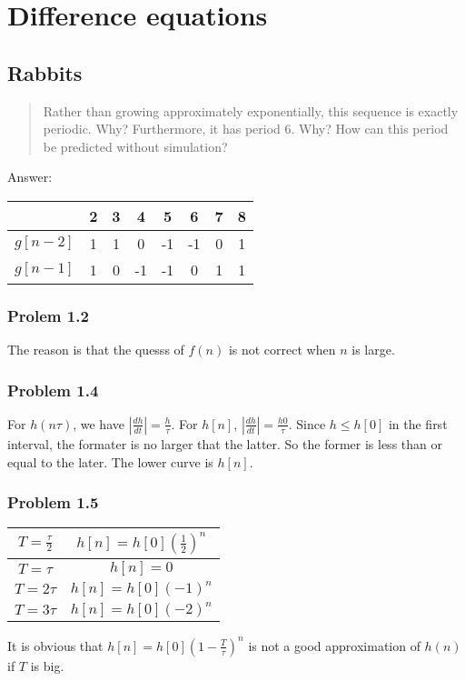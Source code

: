 \documentclass{book}
\begin{document}
\chapter{Difference equations}

\section{Rabbits}

\begin{quote}
  Rather than growing approximately exponentially, this sequence is exactly periodic. Why? Furthermore, it has period 6.
  Why? How can this period be predicted without simulation?
\end{quote}

Answer:
\begin{center}
\begin{tabular}{ |c|c|c|c|c|c|c|c| } 
 \hline
           & 2 & 3 & 4  & 5  & 6  & 7 & 8 \\
\hline \hline
  $g[n-2]$ & 1 & 1 & 0  & -1 & -1 & 0 & 1 \\ 
  \hline
  $g[n-1]$ & 1 & 0 & -1 & -1 & 0  & 1 & 1 \\ 
 \hline
\end{tabular}
\end{center}

\subsection*{Prolem 1.2}
The reason is that the quesss of $f(n)$ is not correct when $n$ is large.

\subsection*{Problem 1.4}
For $h(n\tau)$, we have $|\frac{dh}{dt}| = \frac{h}{\tau}$. For $h[n]$, $|\frac{dh}{dt}|=\frac{h{0}}{\tau}$. Since $h \le h[0]$ in the first interval, the
formater is no larger that the latter. So the former is less than or equal to the later. The lower curve is $h[n]$.

\subsection*{Problem 1.5}
\begin{center}
  \begin{tabular}{|c|c|}
    \hline
    $T = \frac{\tau}{2}$ & $h[n]=h[0](\frac{1}{2})^n$ \\
    \hline
    $T = \tau$ & $h[n] = 0$ \\
    \hline
    $T = 2\tau$ & $h[n] = h[0](-1)^n$ \\
    \hline
    $T = 3\tau$ & $h[n] = h[0](-2)^n$ \\
    \hline
  \end{tabular}
\end{center}
It is obvious that $h[n] = h[0](1-\frac{T}{\tau})^n$ is not a good approximation of $h(n)$ if $T$ is big.
\end{document}
